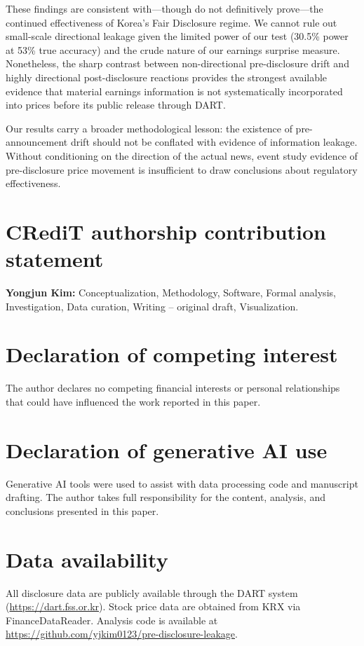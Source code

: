 \documentclass[review,authoryear]{elsarticle}
\begin{document}
These findings are consistent with---though do not definitively prove---the continued effectiveness of Korea's Fair Disclosure regime. We cannot rule out small-scale directional leakage given the limited power of our test (30.5\% power at 53\% true accuracy) and the crude nature of our earnings surprise measure. Nonetheless, the sharp contrast between non-directional pre-disclosure drift and highly directional post-disclosure reactions provides the strongest available evidence that material earnings information is not systematically incorporated into prices before its public release through DART.

Our results carry a broader methodological lesson: the existence of pre-announcement drift should not be conflated with evidence of information leakage. Without conditioning on the direction of the actual news, event study evidence of pre-disclosure price movement is insufficient to draw conclusions about regulatory effectiveness.

\section*{CRediT authorship contribution statement}
\textbf{Yongjun Kim:} Conceptualization, Methodology, Software, Formal analysis, Investigation, Data curation, Writing -- original draft, Visualization.

\section*{Declaration of competing interest}
The author declares no competing financial interests or personal relationships that could have influenced the work reported in this paper.

\section*{Declaration of generative AI use}
Generative AI tools were used to assist with data processing code and manuscript drafting. The author takes full responsibility for the content, analysis, and conclusions presented in this paper.

\section*{Data availability}
All disclosure data are publicly available through the DART system (\url{https://dart.fss.or.kr}). Stock price data are obtained from KRX via FinanceDataReader. Analysis code is available at \url{https://github.com/yjkim0123/pre-disclosure-leakage}.



\end{document}
